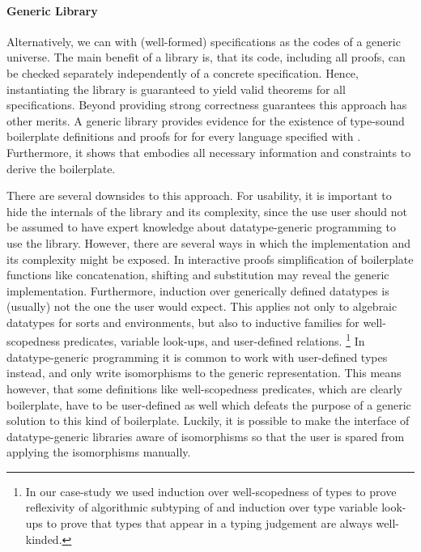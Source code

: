 \paragraph{Generic Library}
Alternatively, we can with (well-formed) \Knot specifications as the codes of a
generic universe. The main benefit of a library is, that its code, including all
proofs, can be checked separately independently of a concrete specification.
Hence, instantiating the library is guaranteed to yield valid theorems for all
specifications. Beyond providing strong correctness guarantees this approach has
other merits. A generic library provides evidence for the existence of
type-sound boilerplate definitions and proofs for for every language specified
with \Knot. Furthermore, it shows that \Knot embodies all necessary information
and constraints to derive the boilerplate.

There are several downsides to this approach. For usability, it is important to
hide the internals of the library and its complexity, since the use user should
not be assumed to have expert knowledge about datatype-generic programming to
use the library. However, there are several ways in which the implementation and
its complexity might be exposed. In interactive proofs simplification of
boilerplate functions like concatenation, shifting and substitution may reveal
the generic implementation. Furthermore, induction over generically defined
datatypes is (usually) not the one the user would expect. This applies not only
to algebraic datatypes for sorts and environments, but also to inductive
families for well-scopedness predicates, variable look-ups, and user-defined
relations.
\footnote{In our case-study we used induction over well-scopedness of types to
  prove reflexivity of algorithmic subtyping of \fsub\xspace and induction over
  type variable look-ups to prove that \fomega\xspace types that appear in a
  typing judgement are always well-kinded.} In datatype-generic programming it
is common to work with user-defined types instead, and only write isomorphisms
to the generic representation. This means however, that some definitions like
well-scopedness predicates, which are clearly boilerplate, have to be
user-defined as well which defeats the purpose of a generic solution to this
kind of boilerplate. Luckily, it is possible to make the interface of
datatype-generic libraries aware of isomorphisms so that the user is spared from
applying the isomorphisms manually.

